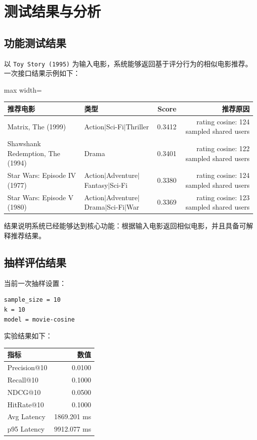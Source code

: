 \section{测试结果与分析}

\subsection{功能测试结果}

以 \texttt{Toy Story (1995)} 为输入电影，系统能够返回基于评分行为的相似电影推荐。
一次接口结果示例如下：

\begin{center}
\begin{adjustbox}{max width=\textwidth}
\begin{tabular}{llrr}
\toprule
\textbf{推荐电影} & \textbf{类型} & \textbf{Score} & \textbf{推荐原因} \\
\midrule
Matrix, The (1999)               & Action$|$Sci-Fi$|$Thriller                         & 0.3412 & rating cosine: 124 sampled shared users \\
Shawshank Redemption, The (1994) & Drama                                              & 0.3401 & rating cosine: 122 sampled shared users \\
Star Wars: Episode IV (1977)     & Action$|$Adventure$|$Fantasy$|$Sci-Fi               & 0.3380 & rating cosine: 124 sampled shared users \\
Star Wars: Episode V (1980)      & Action$|$Adventure$|$Drama$|$Sci-Fi$|$War          & 0.3369 & rating cosine: 123 sampled shared users \\
\bottomrule
\end{tabular}
\end{adjustbox}
\end{center}

结果说明系统已经能够达到核心功能：根据输入电影返回相似电影，并且具备可解释推荐结果。

\subsection{抽样评估结果}

当前一次抽样设置：

\begin{verbatim}
sample_size = 10
k = 10
model = movie-cosine
\end{verbatim}

实验结果如下：

\begin{center}
\begin{tabular}{lr}
\toprule
\textbf{指标} & \textbf{数值} \\
\midrule
Precision@10 & 0.0100 \\
Recall@10    & 0.1000 \\
NDCG@10      & 0.0500 \\
HitRate@10   & 0.1000 \\
Avg Latency  & 1869.201 ms \\
p95 Latency  & 9912.077 ms \\
\bottomrule
\end{tabular}
\end{center}


